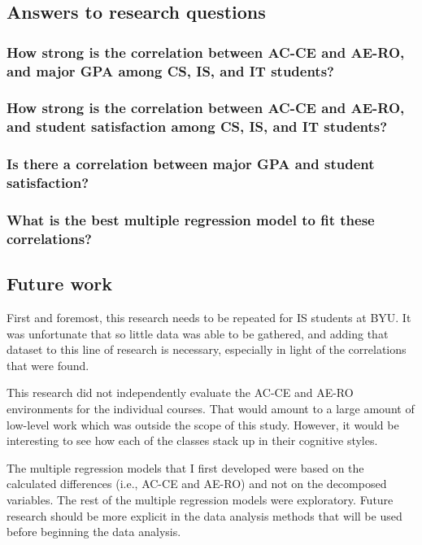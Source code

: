 \subsection{Answers to research questions}
\subsubsection{How strong is the correlation between AC-CE and AE-RO, and major GPA among CS, IS, and IT students?}


\subsubsection{How strong is the correlation between AC-CE and AE-RO, and student satisfaction among CS, IS, and IT students?}


\subsubsection{Is there a correlation between major GPA and student satisfaction?}


\subsubsection{What is the best multiple regression model to fit these correlations?}


\subsection{Future work}
First and foremost, this research needs to be repeated for IS students at BYU. It was unfortunate that so little data was able to be gathered, and adding that dataset to this line of research is necessary, especially in light of the correlations that were found.

This research did not independently evaluate the AC-CE and AE-RO environments for the individual courses. That would amount to a large amount of low-level work which was outside the scope of this study. However, it would be interesting to see how each of the classes stack up in their cognitive styles.

The multiple regression models that I first developed were based on the calculated differences (i.e., AC-CE and AE-RO) and not on the decomposed variables. The rest of the multiple regression models were exploratory. Future research should be more explicit in the data analysis methods that will be used before beginning the data analysis.


